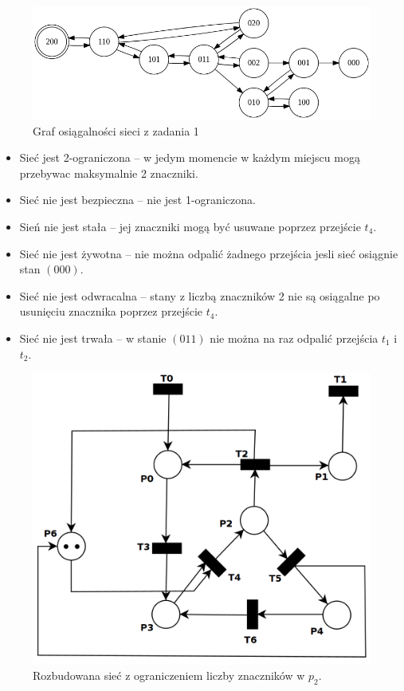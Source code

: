 \documentclass[12pt]{article}
\begin{document}
\begin{figure}[h]
    \centering
    \includegraphics[width=\linewidth]{../../lab6/graph.dot.png}
    \caption{Graf osiągalności sieci z zadania 1}
\end{figure}


\begin{itemize}[noitemsep]
    \item Sieć jest 2-ograniczona -- w jedym momencie w każdym miejscu mogą przebywac maksymalnie 2 znaczniki.
    \item Sieć nie jest bezpieczna -- nie jest 1-ograniczona.
    \item Sień nie jest stała -- jej znaczniki mogą być usuwane poprzez przejście $t_4$.
    \item Sieć nie jest żywotna -- nie można odpalić żadnego przejścia jesli sieć osiągnie stan $(000)$.
    \item Sieć nie jest odwracalna -- stany z liczbą znaczników 2 nie są osiągalne po usunięciu znacznika poprzez przejście $t_4$.
    \item Sieć nie jest trwała -- w stanie $(011)$ nie można na raz odpalić przejścia $t_1$ i $t_2$.
\end{itemize}

\newpage


\begin{figure}[h]
    \centering
    \includegraphics[width=0.8\linewidth]{../../lab6/ex_4}
    \caption{Rozbudowana sieć z ograniczeniem liczby znaczników w $p_2$.}
\end{figure}
\end{document}
